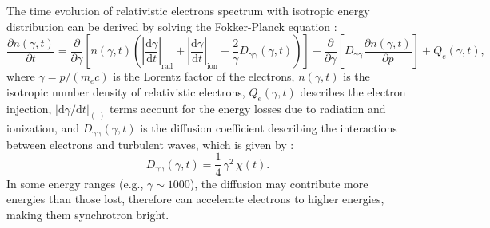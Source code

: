 \documentclass[modern]{aastex61}
\newcommand{\R}[1]{\mathrm{#1}}
\newcommand{\D}[1]{\R{d} #1}
\newcommand{\diff}[2]{\frac{\D{#1}}{\D{#2}}}
\newcommand{\pdiff}[2]{\frac{\partial #1}{\partial #2}}
\begin{document}
The time evolution of relativistic electrons spectrum with isotropic energy
distribution can be derived by solving the Fokker-Planck equation
\citep{eilek1991,schlickeiser2002}:
\begin{equation}
  \label{eq:fokkerplanck}
  \pdiff{n(\gamma,t)}{t} = \pdiff{}{\gamma} \left[ n(\gamma,t) \left(
      \left| \diff{\gamma}{t} \right|_{\R{rad}} +
      \left| \diff{\gamma}{t} \right|_{\R{ion}} -
      \frac{2}{\gamma} D_{\R{\gamma\gamma}}(\gamma, t) \right) \right] +
  \pdiff{}{\gamma} \left[ D_{\R{\gamma\gamma}} \pdiff{n(\gamma,t)}{p} \right] +
  Q_e(\gamma,t),
\end{equation}
where $\gamma = p / (m_e c)$ is the Lorentz factor of the electrons,
$n(\gamma, t)$ is the isotropic number density of relativistic
electrons, $Q_e(\gamma, t)$ describes the electron injection,
$|\R{d}\gamma / \R{d}t|_{(\cdot)}$ terms account for the
energy losses due to radiation and ionization,
and $D_{\R{\gamma\gamma}}(\gamma, t)$ is the diffusion coefficient
describing the interactions between electrons and turbulent waves,
which is given by \citep{brunetti2011}:
\begin{equation}
  \label{eq:diffusion-coef}
  D_{\R{\gamma\gamma}}(\gamma, t) = \frac{1}{4} \,\gamma^2\,\chi(t).
\end{equation}
In some energy ranges (e.g., $\gamma \sim 1000$), the diffusion may
contribute more energies than those lost, therefore can accelerate electrons
to higher energies, making them synchrotron bright.
\end{document}
